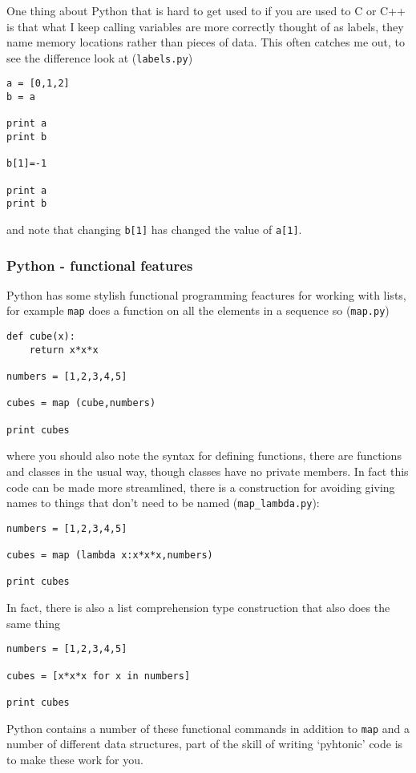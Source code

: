 \documentclass[12pt]{article}
\begin{document}
One thing about Python that is hard to get used to if you are used to
C or C++ is that what I keep calling variables are more correctly
thought of as labels, they name memory locations rather than pieces of
data. This often catches me out, to see the difference look at
(\texttt{labels.py})
\begin{lstlisting}[numbers=right]
a = [0,1,2]
b = a

print a
print b

b[1]=-1

print a
print b
\end{lstlisting}
and note that changing \texttt{b[1]} has changed the value of \texttt{a[1]}.

\subsubsection*{Python - functional features}

Python has some stylish functional programming feactures for working
with lists, for example \texttt{map} does a function on all the
elements in a sequence so (\texttt{map.py})
\begin{lstlisting}[numbers=right]
def cube(x):
    return x*x*x

numbers = [1,2,3,4,5]

cubes = map (cube,numbers)

print cubes
\end{lstlisting}
where you should also note the syntax for defining functions, there
are functions and classes in the usual way, though classes have no
private members. In fact this code can be made more streamlined, there
is a construction for avoiding giving names to things that don't need
to be named  (\texttt{map\_lambda.py}):
\begin{lstlisting}[numbers=right]
numbers = [1,2,3,4,5]

cubes = map (lambda x:x*x*x,numbers)

print cubes
\end{lstlisting}
In fact, there is also a list comprehension type construction that also does the same thing
\begin{lstlisting}[numbers=right]
numbers = [1,2,3,4,5]

cubes = [x*x*x for x in numbers]

print cubes
\end{lstlisting}

Python contains a number of these functional commands in addition to
\texttt{map} and a number of different data structures, part of the
skill of writing \lq{}pyhtonic\rq{} code is to make these work for
you.
\end{document}

